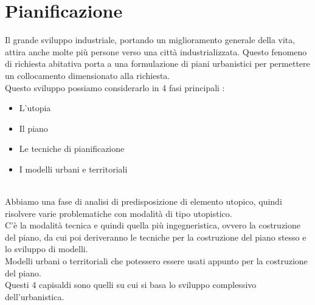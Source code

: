 \documentclass[a4paper,12pt, oneside]{book}
\begin{document}
\chapter{Pianificazione}
Il grande sviluppo industriale, portando un miglioramento generale della vita, attira anche molte più persone verso una città industrializzata. Questo fenomeno di richiesta abitativa porta a una formulazione di piani urbanistici per permettere un collocamento dimensionato alla richiesta.\\
Questo sviluppo possiamo considerarlo in 4 fasi principali : \\
 \begin{itemize}
   \item L'utopia
   \item Il piano
   \item Le tecniche di pianificazione
   \item I modelli urbani e territoriali
 \end{itemize}
\leavevmode\\
Abbiamo una fase di analisi di predisposizione di elemento utopico, quindi risolvere varie problematiche con modalità di tipo utopistico.\\
C'è la modalità tecnica e quindi quella più ingegneristica, ovvero la costruzione del piano, da cui poi deriveranno le tecniche per la costruzione del piano stesso e lo sviluppo di modelli.\\
Modelli urbani o territoriali che potessero essere usati appunto per la costruzione del piano.\\
Questi 4 capisaldi sono quelli su cui si basa lo sviluppo complessivo dell'urbanistica.\\
\end{document}
